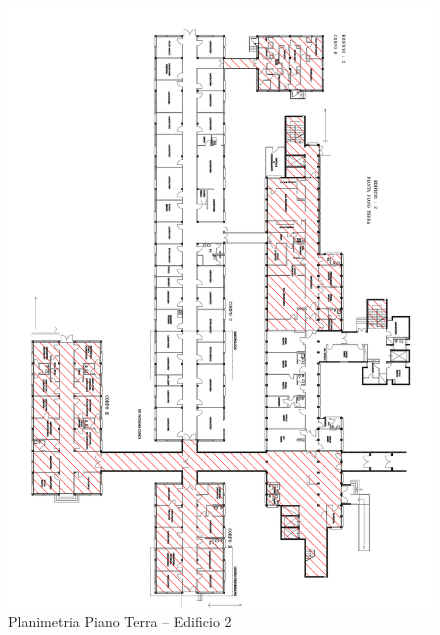 \begin{figure}
	\centering
		\includegraphics[width=\hsize]{6_2_cap/img/PT}
		\caption{Planimetria Piano Terra -- Edificio 2}
		\label{img:PT}
\end{figure}
